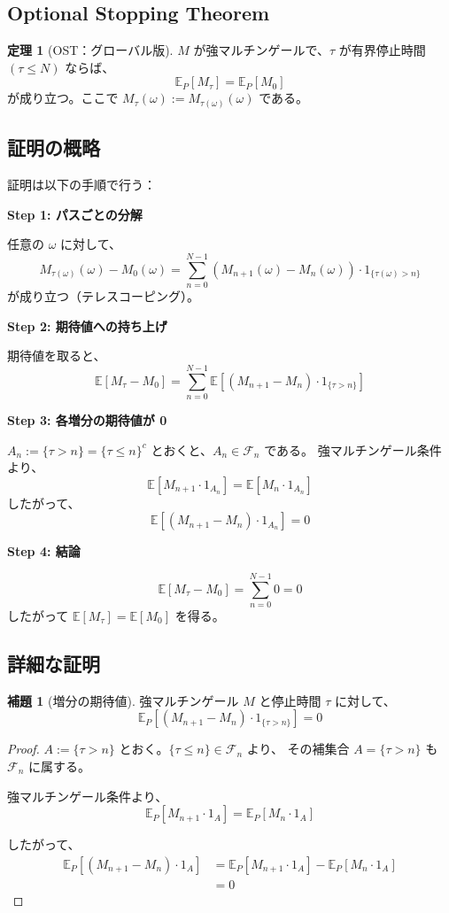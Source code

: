 \documentclass[a4paper,12pt]{ltjsarticle}
\theoremstyle{definition}
\newtheorem{theorem}[definition]{定理}
\newtheorem{lemma}[definition]{補題}
\begin{document}
\subsection{Optional Stopping Theorem}

\begin{theorem}[OST：グローバル版]
$M$ が強マルチンゲールで、$\tau$ が有界停止時間 $(\tau \leq N)$ ならば、
\[
\mathbb{E}_P[M_\tau] = \mathbb{E}_P[M_0]
\]
が成り立つ。ここで $M_\tau(\omega) := M_{\tau(\omega)}(\omega)$ である。
\end{theorem}

\subsection{証明の概略}

証明は以下の手順で行う：

\textbf{Step 1: パスごとの分解}

任意の $\omega$ に対して、
\[
M_{\tau(\omega)}(\omega) - M_0(\omega) = \sum_{n=0}^{N-1} (M_{n+1}(\omega) - M_n(\omega)) \cdot 1_{\{\tau(\omega) > n\}}
\]
が成り立つ（テレスコーピング）。

\textbf{Step 2: 期待値への持ち上げ}

期待値を取ると、
\[
\mathbb{E}[M_\tau - M_0] = \sum_{n=0}^{N-1} \mathbb{E}[(M_{n+1} - M_n) \cdot 1_{\{\tau > n\}}]
\]

\textbf{Step 3: 各増分の期待値が 0}

$A_n := \{\tau > n\} = \{\tau \leq n\}^c$ とおくと、$A_n \in \mathcal{F}_n$ である。
強マルチンゲール条件より、
\[
\mathbb{E}[M_{n+1} \cdot 1_{A_n}] = \mathbb{E}[M_n \cdot 1_{A_n}]
\]
したがって、
\[
\mathbb{E}[(M_{n+1} - M_n) \cdot 1_{A_n}] = 0
\]

\textbf{Step 4: 結論}

\[
\mathbb{E}[M_\tau - M_0] = \sum_{n=0}^{N-1} 0 = 0
\]
したがって $\mathbb{E}[M_\tau] = \mathbb{E}[M_0]$ を得る。

\subsection{詳細な証明}

\begin{lemma}[増分の期待値]
強マルチンゲール $M$ と停止時間 $\tau$ に対して、
\[
\mathbb{E}_P[(M_{n+1} - M_n) \cdot 1_{\{\tau > n\}}] = 0
\]
\end{lemma}

\begin{proof}
$A := \{\tau > n\}$ とおく。$\{\tau \leq n\} \in \mathcal{F}_n$ より、
その補集合 $A = \{\tau > n\}$ も $\mathcal{F}_n$ に属する。

強マルチンゲール条件より、
\[
\mathbb{E}_P[M_{n+1} \cdot 1_A] = \mathbb{E}_P[M_n \cdot 1_A]
\]

したがって、
\begin{align*}
\mathbb{E}_P[(M_{n+1} - M_n) \cdot 1_A]
&= \mathbb{E}_P[M_{n+1} \cdot 1_A] - \mathbb{E}_P[M_n \cdot 1_A] \\
&= 0
\end{align*}
\end{proof}
\end{document}
